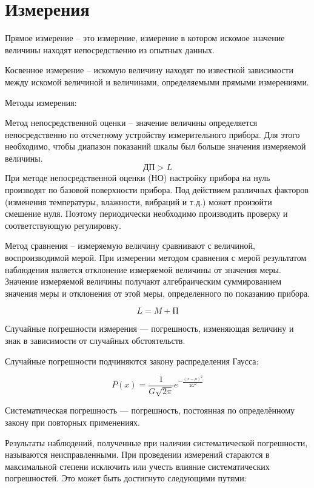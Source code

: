 \section{Измерения}

Прямое измерение – это измерение, измерение в котором искомое значение величины находят непосредственно из опытных данных.

Косвенное измерение – искомую величину находят по известной зависимости между искомой величиной и величинами, определяемыми прямыми измерениями.

Методы измерения:

Метод непосредственной оценки – значение величины определяется непосредственно по отсчетному устройству измерительного прибора.
Для этого необходимо, чтобы диапазон показаний шкалы был больше значения измеряемой величины.
\[  ДП>L  \]
При методе непосредственной оценки (НО) настройку прибора на нуль производят по базовой поверхности прибора. Под действием различных факторов (изменения температуры, влажности, вибраций и т.д.) может произойти смешение нуля. Поэтому периодически необходимо производить проверку и соответствующую регулировку.

Метод сравнения – измеряемую величину сравнивают с величиной, воспроизводимой мерой. При измерении методом сравнения с мерой результатом наблюдения является отклонение измеряемой величины от значения меры. Значение измеряемой величины получают алгебраическим суммированием значения меры и отклонения от этой меры, определенного по показанию прибора.

\[ L = M + П \]

Случайные погрешности измерения --- погрешность, изменяющая величину и знак в зависимости от случайных обстоятельств.

Случайные погрешности подчиняются закону распределения Гаусса:

\[ P(x) = \dfrac{1}{G \sqrt{2 \pi}} e^{-\frac{(x - \mu)^2}{2 G^2}} \]

Систематическая погрешность --- погрешность, постоянная по определённому закону при повторных применениях.

 Результаты наблюдений, полученные при наличии систематической погрешности, называются неисправленными. При проведении измерений стараются в максимальной степени исключить или учесть влияние систематических погрешностей. Это может быть достигнуто следующими путями:

